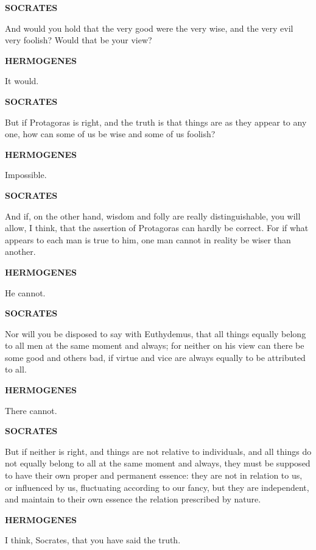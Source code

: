 \documentclass[11pt,letter]{article}
\begin{document}
\par \textbf{SOCRATES}
\par   And would you hold that the very good were the very wise, and the very evil very foolish? Would that be your view?

\par \textbf{HERMOGENES}
\par   It would.

\par \textbf{SOCRATES}
\par   But if Protagoras is right, and the truth is that things are as they appear to any one, how can some of us be wise and some of us foolish?

\par \textbf{HERMOGENES}
\par   Impossible.

\par \textbf{SOCRATES}
\par   And if, on the other hand, wisdom and folly are really distinguishable, you will allow, I think, that the assertion of Protagoras can hardly be correct. For if what appears to each man is true to him, one man cannot in reality be wiser than another.

\par \textbf{HERMOGENES}
\par   He cannot.

\par \textbf{SOCRATES}
\par   Nor will you be disposed to say with Euthydemus, that all things equally belong to all men at the same moment and always; for neither on his view can there be some good and others bad, if virtue and vice are always equally to be attributed to all.

\par \textbf{HERMOGENES}
\par   There cannot.

\par \textbf{SOCRATES}
\par   But if neither is right, and things are not relative to individuals, and all things do not equally belong to all at the same moment and always, they must be supposed to have their own proper and permanent essence:  they are not in relation to us, or influenced by us, fluctuating according to our fancy, but they are independent, and maintain to their own essence the relation prescribed by nature.

\par \textbf{HERMOGENES}
\par   I think, Socrates, that you have said the truth.
\end{document}
